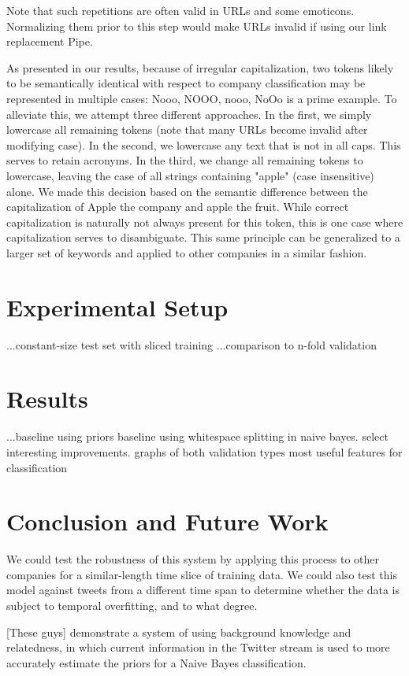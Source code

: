\documentclass[letterpaper]{article}
\begin{document}
Note that such repetitions are often valid in URLs and some emoticons. Normalizing them prior to this step would make URLs invalid if using our link replacement Pipe.

As presented in our results, because of irregular capitalization, two tokens likely to be semantically identical with respect to company classification may be represented in multiple cases: {Nooo, NOOO, nooo, NoOo} is a prime example. To alleviate this, we attempt three different approaches. In the first, we simply lowercase all remaining tokens (note that many URLs become invalid after modifying case). In the second, we lowercase any text that is not in all caps. This serves to retain acronyms. In the third, we change all remaining tokens to lowercase, leaving the case of all strings containing "apple" (case insensitive) alone. We made this decision based on the semantic difference between the capitalization of Apple the company and apple the fruit. While correct capitalization is naturally not always present for this token, this is one case where capitalization serves to disambiguate. This same principle can be generalized to a larger set of keywords and applied to other companies in a similar fashion. 

\section{Experimental Setup}
...constant-size test set with sliced training
...comparison to n-fold validation

\section{Results}
...baseline using priors
  baseline using whitespace splitting in naive bayes.
  select interesting improvements.
  graphs of both validation types
  most useful features for classification

\section{Conclusion and Future Work}

We could test the robustness of this system by applying this process to other companies for a similar-length time slice of training data. We could also test this model against tweets from a different time span to determine whether the data is subject to temporal overfitting, and to what degree.

[These guys] demonstrate a system of using background knowledge and relatedness, in which current information in the Twitter stream is used to more accurately estimate the priors for a Naive Bayes classification.
\end{document}

